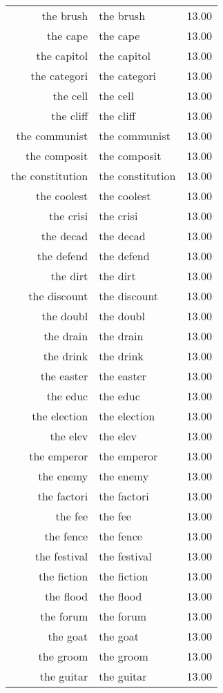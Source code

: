\begin{table}[ht]
\begin{tabular}{rlr}
  the brush & the brush & 13.00 \\ 
  the cape & the cape & 13.00 \\ 
  the capitol & the capitol & 13.00 \\ 
  the categori & the categori & 13.00 \\ 
  the cell & the cell & 13.00 \\ 
  the cliff & the cliff & 13.00 \\ 
  the communist & the communist & 13.00 \\ 
  the composit & the composit & 13.00 \\ 
  the constitution & the constitution & 13.00 \\ 
  the coolest & the coolest & 13.00 \\ 
  the crisi & the crisi & 13.00 \\ 
  the decad & the decad & 13.00 \\ 
  the defend & the defend & 13.00 \\ 
  the dirt & the dirt & 13.00 \\ 
  the discount & the discount & 13.00 \\ 
  the doubl & the doubl & 13.00 \\ 
  the drain & the drain & 13.00 \\ 
  the drink & the drink & 13.00 \\ 
  the easter & the easter & 13.00 \\ 
  the educ & the educ & 13.00 \\ 
  the election & the election & 13.00 \\ 
  the elev & the elev & 13.00 \\ 
  the emperor & the emperor & 13.00 \\ 
  the enemy & the enemy & 13.00 \\ 
  the factori & the factori & 13.00 \\ 
  the fee & the fee & 13.00 \\ 
  the fence & the fence & 13.00 \\ 
  the festival & the festival & 13.00 \\ 
  the fiction & the fiction & 13.00 \\ 
  the flood & the flood & 13.00 \\ 
  the forum & the forum & 13.00 \\ 
  the goat & the goat & 13.00 \\ 
  the groom & the groom & 13.00 \\ 
  the guitar & the guitar & 13.00 \\ 

\end{tabular}
\end{table}
